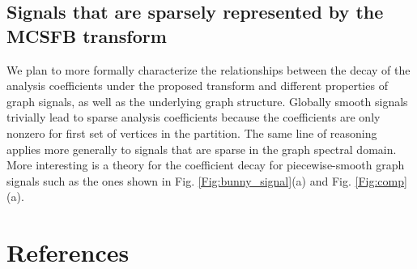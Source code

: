 \documentclass{article}
\begin{document}
\subsection{Signals that are sparsely represented by the MCSFB transform}
We  plan to more formally characterize the relationships between the decay of the analysis coefficients under the proposed transform and different properties of graph signals, as well as the underlying graph structure.
Globally smooth signals trivially lead to sparse analysis coefficients because the coefficients are only nonzero for first set of vertices in the partition. The same line of reasoning applies more generally to signals that are sparse in the graph spectral domain. More interesting is a theory for the coefficient decay for piecewise-smooth graph signals such as the ones shown in Fig. \ref{Fig:bunny_signal}(a) and Fig. \ref{Fig:comp}(a).

\section{References}
\balance

{\small }
\end{document}
